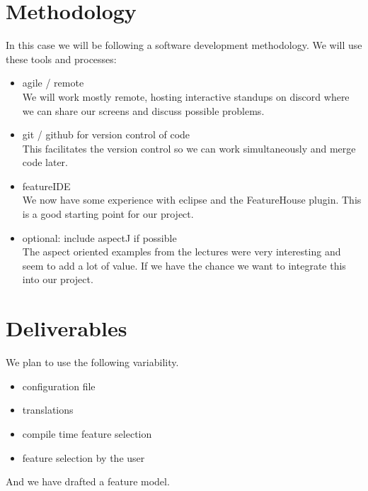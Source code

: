 \documentclass[]{article}
\begin{document}
\section{Methodology}
In this case we will be following a software development methodology. We will use these tools and processes:
\begin{itemize}
	\item agile / remote\\
		  We will work mostly remote, hosting interactive standups on discord where we can share our screens and discuss possible problems.
	\item git / github for version control of code\\
		  This facilitates the version control so we can work simultaneously and merge code later.
	\item featureIDE\\
		  We now have some experience with eclipse and the FeatureHouse plugin. This is a good starting point for our project.
	\item optional: include aspectJ if possible\\
		  The aspect oriented examples from the lectures were very interesting and seem to add a lot of value. If we have the chance we want to integrate this into our project.
\end{itemize}

\section{Deliverables}
We plan to use the following variability.
\begin{itemize}
	\item configuration file
	\item translations
	\item compile time feature selection
	\item feature selection by the user
\end{itemize}

And we have drafted a feature model.
\begin{figure}[ht]
	
\end{figure}
\end{document}
